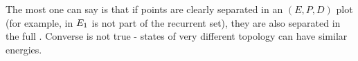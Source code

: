 The most one can say is that if points are clearly separated in an
$(E,P,D)$ plot (for example, in 
$E_{1}$ is not part of the recurrent set), they are also separated
in the full \statesp. Converse is not true - states of 
very different topology can have similar energies.
